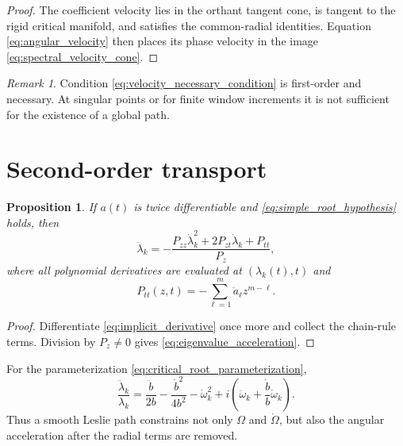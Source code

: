 \documentclass[11pt]{amsart}
\numberwithin{equation}{section}
\theoremstyle{plain}
\newtheorem{proposition}[theorem]{Proposition}
\theoremstyle{definition}
\theoremstyle{remark}
\newtheorem{remark}[theorem]{Remark}
\begin{document}
\begin{proof}
The coefficient velocity lies in the orthant tangent cone, is tangent to the rigid critical manifold, and satisfies the common-radial identities.  Equation \eqref{eq:angular_velocity} then places its phase velocity in the image \eqref{eq:spectral_velocity_cone}.
\end{proof}

\begin{remark}
\label{rem:necessary_not_sufficient}
Condition \eqref{eq:velocity_necessary_condition} is first-order and necessary.  At singular points or for finite window increments it is not sufficient for the existence of a global path.
\end{remark}

\section{Second-order transport}
\label{sec:second_order_transport}

\begin{proposition}
\label{prop:second_derivative}
If $a(t)$ is twice differentiable and \eqref{eq:simple_root_hypothesis} holds, then
\begin{equation}
\ddot\lambda_k
=-
\frac{
P_{zz}\dot\lambda_k^2
+2P_{zt}\dot\lambda_k
+P_{tt}
}{P_z},
\label{eq:eigenvalue_acceleration}
\end{equation}
where all polynomial derivatives are evaluated at $(\lambda_k(t),t)$ and
\begin{equation}
P_{tt}(z,t)
=-\sum_{\ell=1}^{m}\ddot a_\ell z^{m-\ell}.
\label{eq:second_time_derivative}
\end{equation}
\end{proposition}

\begin{proof}
Differentiate \eqref{eq:implicit_derivative} once more and collect the chain-rule terms.  Division by $P_z\neq0$ gives \eqref{eq:eigenvalue_acceleration}.
\end{proof}

For the parameterization \eqref{eq:critical_root_parameterization},
\begin{equation}
\frac{\ddot\lambda_k}{\lambda_k}
=
\frac{\ddot b}{2b}
-\frac{\dot b^2}{4b^2}
-\dot\omega_k^2
+i\left(
\ddot\omega_k+\frac{\dot b}{b}\dot\omega_k
\right).
\label{eq:angular_acceleration_identity}
\end{equation}
Thus a smooth Leslie path constrains not only $\Omega$ and $\dot\Omega$, but also the angular acceleration after the radial terms are removed.
\end{document}
